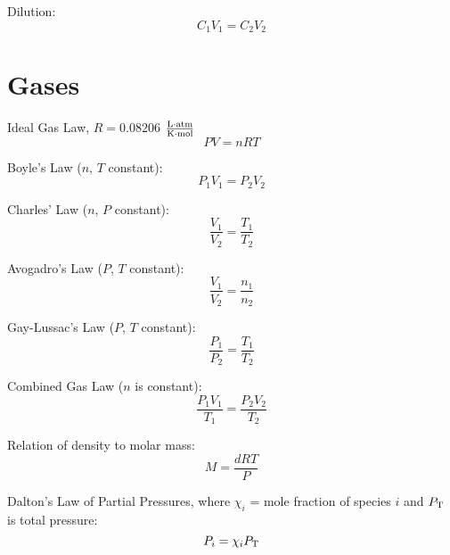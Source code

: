 \documentclass[10pt]{article}
\begin{document}
Dilution:
\begin{equation*}
C_1V_1=C_2V_2
\end{equation*}


\section{Gases}


Ideal Gas Law, $R=0.08206$ $\frac{\textnormal{L$\cdot$atm}}{\textnormal{K$\cdot$mol}}$
\begin{equation*}
PV=nRT
\end{equation*}

Boyle's Law ($n$, $T$ constant):
\begin{equation*}
P_1V_1=P_2V_2
\end{equation*}

Charles' Law ($n$, $P$ constant):
\begin{equation*}
\frac{V_1}{V_2} = \frac{T_1}{T_2} 
\end{equation*}

Avogadro's Law ($P$, $T$ constant):
\begin{equation*}
\frac{V_1}{V_2} = \frac{n_1}{n_2} 
\end{equation*}

Gay-Lussac's Law ($P$, $T$ constant):
\begin{equation*}
\frac{P_1}{P_2} = \frac{T_1}{T_2} 
\end{equation*}

Combined Gas Law ($n$ is constant):
\begin{equation*}
\frac{P_1V_1}{T_1} = \frac{P_2V_2}{T_2}
\end{equation*}

Relation of density to molar mass:
\begin{equation*}
M = \frac{dRT}{P}
\end{equation*}

Dalton's Law of Partial Pressures, where $\chi_i$ = mole fraction of species $i$ and $P_\textnormal{T}$ is total pressure:
\begin{equation*}
P_i=\chi_iP_\textnormal{T}
\end{equation*} 
\end{document}
